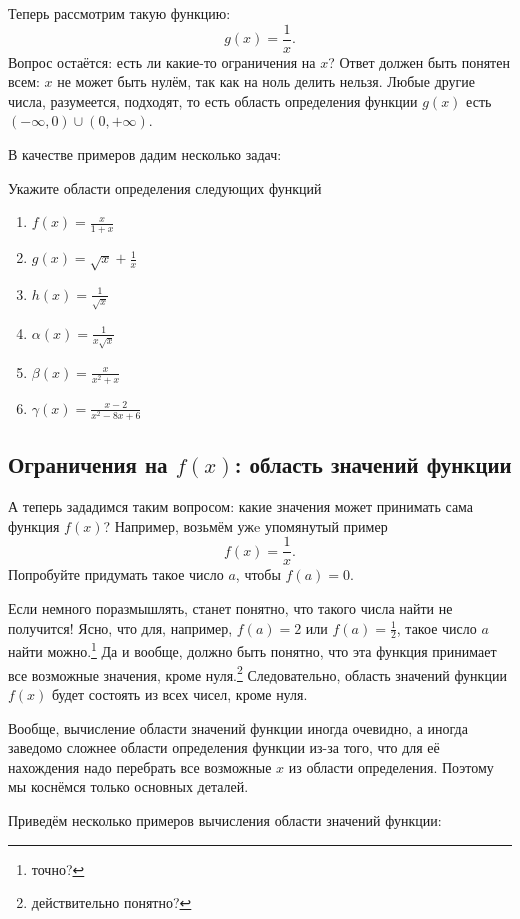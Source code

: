 \documentclass[11pt,fleqn]{book} %
\begin{document}
Теперь рассмотрим такую функцию: $$g(x) = \frac{1}{x}.$$ Вопрос остаётся: есть ли какие-то ограничения на $x$? Ответ должен быть понятен всем: $x$ не может быть нулём, так как на ноль делить нельзя. Любые другие числа, разумеется, подходят, то есть область определения функции $g(x)$ есть $(-\infty, 0)\cup(0, +\infty)$.

В качестве примеров дадим несколько задач:

\begin{exercise}
Укажите области определения следующих функций 
\begin{enumerate}
\item $f(x) = \frac{x}{1+x}$
\item $g(x) = \sqrt x + \frac{1}{x}$
\item $h(x) = \frac{1}{\sqrt{x}}$
\item $\alpha(x) = \frac{1}{x\sqrt{x}}$ 
\item $\beta(x) = \frac{x}{x^2 + x}$ 
\item $\gamma(x) = \frac{x-2}{x^2 - 8x + 6}$
\end{enumerate}
\end{exercise}

\subsection{Ограничения на $f(x)$: область значений функции}
А теперь зададимся таким вопросом: какие значения может принимать сама функция $f(x)$? Например, возьмём ужe упомянутый пример $$f(x) = \frac{1}{x}.$$ Попробуйте придумать такое число $a$, чтобы $f(a) = 0$. 

Если немного поразмышлять, станет понятно, что такого числа найти не получится! Ясно, что для, например, $f(a) = 2$ или $f(a) = \frac{1}{2}$, такое число $a$ найти можно.\footnote{точно?} Да и вообще, должно быть понятно, что эта функция принимает все возможные значения, кроме нуля.\footnote{действительно понятно?} Следовательно, область значений функции $f(x)$ будет состоять из всех чисел, кроме нуля. 

Вообще, вычисление области значений функции иногда очевидно, а иногда заведомо сложнее области определения функции из-за того, что для её нахождения надо перебрать все возможные $x$ из области определения. Поэтому мы коснёмся только основных деталей.

Приведём несколько примеров вычисления области значений функции:
\end{document}
